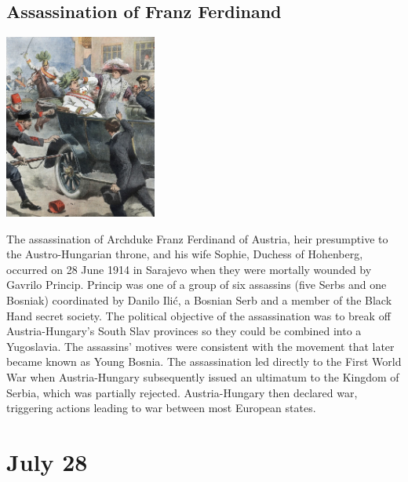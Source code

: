 \documentclass[11pt]{report}
\begin{document}
\subsection{Assassination of Franz Ferdinand}
\vspace{2mm}\begin{center}\includegraphics[width=5cm]{./img/franzFerdinand.jpg}\end{center}
The assassination of Archduke Franz Ferdinand of Austria, heir presumptive to the Austro-Hungarian throne, and his wife Sophie, Duchess of Hohenberg, occurred on 28 June 1914 in Sarajevo when they were mortally wounded by Gavrilo Princip. Princip was one of a group of six assassins (five Serbs and one Bosniak) coordinated by Danilo Ilić, a Bosnian Serb and a member of the Black Hand secret society. The political objective of the assassination was to break off Austria-Hungary's South Slav provinces so they could be combined into a Yugoslavia. The assassins' motives were consistent with the movement that later became known as Young Bosnia. The assassination led directly to the First World War when Austria-Hungary subsequently issued an ultimatum to the Kingdom of Serbia, which was partially rejected. Austria-Hungary then declared war, triggering actions leading to war between most European states.

\section{July 28}
\end{document}
